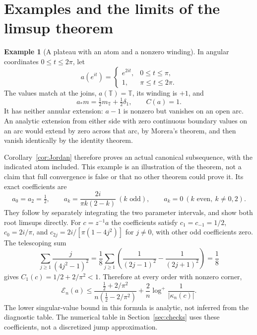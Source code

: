 \documentclass[11pt]{article}
\theoremstyle{definition}
\newtheorem{example}[theorem]{Example}
\newcommand{\T}{\mathbb T}
\newcommand{\E}{\mathcal E}
\begin{document}
\section{Examples and the limits of the limsup theorem}
\begin{example}[A plateau with an atom and a nonzero winding]\label{ex:plateau}
In angular coordinates $0\le t\le2\pi$, let
\begin{equation}
 a(e^{it})=\begin{cases}e^{2it},&0\le t\le\pi,\\1,&\pi\le t\le2\pi.\end{cases}
 \label{eq:plateau}
\end{equation}
The values match at the joins, $a(\T)=\T$, its winding is $+1$, and
\[
 a_*m=\tfrac12 m_\T+\tfrac12\delta_1,\qquad C(a)=1.
\]
It has neither annular extension: $a-1$ is nonzero but vanishes on an open arc. An analytic extension from either side with zero continuous boundary values on an arc would extend by zero across that arc, by Morera's theorem, and then vanish identically by the identity theorem.

Corollary~\ref{cor:Jordan} therefore proves an actual canonical subsequence, with the indicated atom included. This example is an illustration of the theorem, not a claim that full convergence is false or that no other theorem could prove it. Its exact coefficients are
\begin{equation}
 a_0=a_2=\tfrac12,\qquad
 a_k=\frac{2i}{\pi k(2-k)}\ (k\text{ odd}),\qquad
 a_k=0\ (k\text{ even},\ k\ne0,2).
 \label{eq:plateaucoeff}
\end{equation}
They follow by separately integrating the two parameter intervals, and show both root limsups directly. For $c=z^{-1}a$ the coefficients satisfy $c_1=c_{-1}=1/2$, $c_0=2i/\pi$, and $c_{2j}=2i/[\pi(1-4j^2)]$ for $j\ne0$, with other odd coefficients zero. The telescoping sum
\[
 \sum_{j\ge1}\frac{j}{(4j^2-1)^2}
 =\frac18\sum_{j\ge1}\left(\frac1{(2j-1)^2}-\frac1{(2j+1)^2}\right)=\frac18
\]
gives $C_1(c)=1/2+2/\pi^2<1$. Therefore at every order with nonzero corner,
\begin{equation}
 \E_n(a)\le
 \frac{\frac12+2/\pi^2}{n(\frac12-2/\pi^2)}
 +\frac2n\log^+\frac1{|\kappa_n(c)|}.
 \label{eq:plateau-certificate}
\end{equation}
The lower singular-value bound in this formula is analytic, not inferred from the diagnostic table. The numerical table in Section~\ref{sec:checks} uses these coefficients, not a discretized jump approximation.
\end{example}
\end{document}
